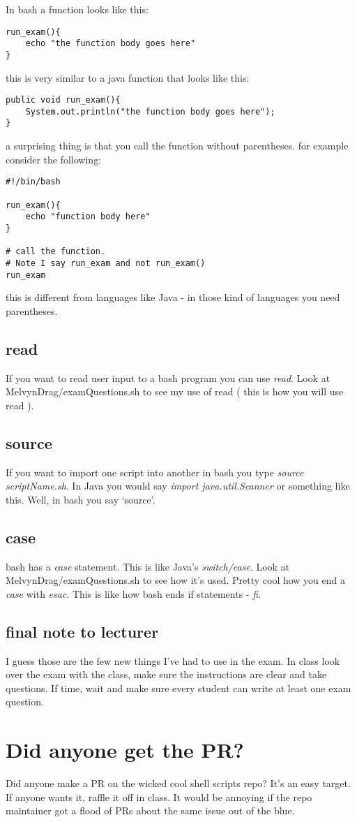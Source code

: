 \documentclass[12pt,a4paper]{article}
\begin{document}
In bash a function looks like this:
\begin{lstlisting}[style=sh]
run_exam(){
	echo "the function body goes here"
}
\end{lstlisting}

this is very similar to a java function that looks like this:

\begin{lstlisting}[style=java]
public void run_exam(){
	System.out.println("the function body goes here");
}
\end{lstlisting}

a surprising thing is that you call the function without parentheses. for
example consider the following:

\begin{lstlisting}[style=sh]
#!/bin/bash

run_exam(){
	echo "function body here"	
}

# call the function. 
# Note I say run_exam and not run_exam()
run_exam
\end{lstlisting}

this is different from languages like Java - in those kind of languages you need
parentheses.

\subsection{read}
If you want to read user input to a bash program you can use \textit{read}. Look
at MelvynDrag/examQuestions.sh to see my use of read ( this is how you will use
read ).

\subsection{source}
If you want to import one script into another in bash you type \textit{source
scriptName.sh}. In Java you would say \textit{import java.util.Scanner} or
something like this. Well, in bash you say `source'.

\subsection{case}
bash has a \textit{case} statement. This is like Java's \textit{switch/case}.
Look at MelvynDrag/examQuestions.sh to see how it's used. Pretty cool how you
end a \textit{case} with \textit{esac}. This is like how bash ends if statements
- \textit{fi}.

\subsection{final note to lecturer}
I guess those are the few new things I've had to use in the exam. In class look over the exam with the class, make sure the instructions are clear
and take questions. If time, wait and make sure every student can write at least
one exam question.

\section{Did anyone get the PR?}
Did anyone make a PR on the wicked cool shell scripts repo? It's an easy target.
If anyone wants it, raffle it off in class. It would be annoying if the repo
maintainer got a flood of PRs about the same issue out of the blue.
\end{document}
